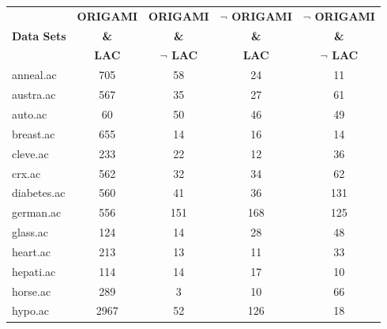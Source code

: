 \begin{table}[htbp]
	\centering
		\begin{tabular}{|l|c|c|c|c|}
		\hline
				& \textbf{ORIGAMI}	& \textbf{ORIGAMI}		& \textbf{$\neg$ ORIGAMI}	& \textbf{$\neg$ ORIGAMI}	\\
		\textbf{Data Sets}	& \textbf{\&}		& \textbf{\&}			& \textbf{\&}			& \textbf{\&}			\\
				&  \textbf{LAC}		& \textbf{$\neg$ LAC}		& \textbf{LAC}			& \textbf{$\neg$ LAC}		\\
		\hline
		anneal.ac       & 705           & 58                 & 24                       & 11                            \\
		\hline
		austra.ac       & 567           & 35                 & 27                       & 61                            \\
		\hline
		auto.ac         & 60            & 50                 & 46                       & 49                            \\
		\hline
		breast.ac       & 655           & 14                 & 16                       & 14                            \\
		\hline
		cleve.ac        & 233           & 22                 & 12                       & 36                            \\
		\hline
		crx.ac          & 562           & 32                 & 34                       & 62                            \\
		\hline
		diabetes.ac     & 560           & 41                 & 36                       & 131                           \\
		\hline
		german.ac       & 556           & 151                & 168                      & 125                           \\
		\hline
		glass.ac        & 124           & 14                 & 28                       & 48                            \\
		\hline
		heart.ac        & 213           & 13                 & 11                       & 33                            \\
		\hline
		hepati.ac       & 114           & 14                 & 17                       & 10                            \\
		\hline
		horse.ac        & 289           & 3                  & 10                       & 66                            \\
		\hline
		hypo.ac         & 2967          & 52                 & 126                      & 18                            \\

\end{tabular}
\end{table}
